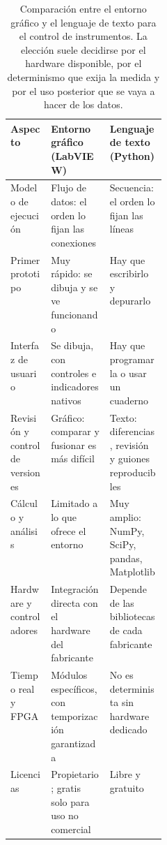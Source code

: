 \begin{table}[ht]
    \centering
    \small
    \setlength{\tabcolsep}{3pt}
    \forcerectofloat %
    \begin{tabularx}{\linewidth}{@{} L{0.26\linewidth} >{\centering\arraybackslash}X >{\centering\arraybackslash}X @{}}
        \toprule
        \textbf{Aspecto} & \textbf{Entorno gráfico (LabVIEW)} & \textbf{Lenguaje de texto (Python)} \\
        \midrule
        Modelo de ejecución & Flujo de datos: el orden lo fijan las conexiones & Secuencia: el orden lo fijan las líneas \\
        Primer prototipo & Muy rápido: se dibuja y se ve funcionando & Hay que escribirlo y depurarlo \\
        Interfaz de usuario & Se dibuja, con controles e indicadores nativos & Hay que programarla o usar un cuaderno \\
        Revisión y control de versiones & Gráfico: comparar y fusionar es más difícil & Texto: diferencias, revisión y guiones reproducibles \\
        Cálculo y análisis & Limitado a lo que ofrece el entorno & Muy amplio: NumPy, SciPy, pandas, Matplotlib \\
        Hardware y controladores & Integración directa con el hardware del fabricante & Depende de las bibliotecas de cada fabricante \\
        Tiempo real y FPGA & Módulos específicos, con temporización garantizada & No es determinista sin hardware dedicado \\
        Licencias & Propietario; gratis solo para uso no comercial & Libre y gratuito \\
        \bottomrule
    \end{tabularx}
    \caption[Entorno gráfico frente a lenguaje de texto en instrumentación.]{Comparación entre el entorno gráfico y el lenguaje de texto para el control de instrumentos. La elección suele decidirse por el hardware disponible, por el determinismo que exija la medida y por el uso posterior que se vaya a hacer de los datos.\protect\label{tab:labview_vs_python}}
\end{table}

